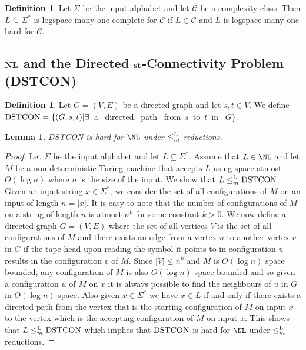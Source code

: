 \documentclass{amsbook}
\newtheorem{lemma}[theorem]{Lemma}
\theoremstyle{definition}
\newtheorem{definition}[theorem]{Definition}
\theoremstyle{remark}
\numberwithin{section}{chapter}
\numberwithin{equation}{chapter}
\newcommand{\Lredn}{\leq^{\small{\rm L}}_m}
\newcommand{\boldNL}{\mbox{\rm \bf NL}}
\begin{document}
\begin{definition}
Let $\Sigma$ be the input alphabet and let $\mathcal{C}$ be a complexity class. Then $L\subseteq \Sigma^*$ is logspace many-one complete for $\mathcal{C}$ if $L\in\mathcal{C}$ and $L$ is logspace many-one hard for $\mathcal{C}$.
\end{definition}

\subsection{$\boldNL$ and the Directed $\bf{st}$-Connectivity Problem (DSTCON)}
\begin{definition}\label{dstcon-defn}
Let $G=(V,E)$ be a directed graph and let $s,t\in V$. We define ${\rm DSTCON}=\{(G,s,t)|\exists${\rm ~a~ directed~ path~ from~}$s${\rm ~to~}$t$~{\rm in~ }$G\}$.
\end{definition}
\begin{lemma}\label{DSTCONisNLhard}
{\rm DSTCON} is hard for $\NL$ under $\Lredn$ reductions.
\end{lemma}
\begin{proof}
Let $\Sigma$ be the input alphabet and let $L\subseteq \Sigma^*$. Assume that $L\in \NL$ and let $M$ be a non-deterministic Turing machine that accepts $L$ using space atmost $O(\log n)$ where $n$ is the size of the input. We show that $L\Lredn {\rm DSTCON}$. Given an input string $x\in \Sigma^*$, we consider the set of all configurations of $M$ on an input of length $n=|x|$. It is easy to note that the number of configurations of $M$ on a string of length $n$ is atmost $n^k$ for some constant $k>0$. We now define a directed graph $G=(V,E)$ where the set of all vertices $V$ is the set of all configurations of $M$ and there exists an edge from a vertex $u$ to another vertex $v$ in $G$ if the tape head upon reading the symbol it points to in configuration $u$ results in the configuration $v$ of $M$. Since $|V|\leq n^k$ and $M$ is $O(\log n)$ space bounded, any configuration of $M$ is also $O(\log n)$ space bounded and so given a configuration $u$ of $M$ on $x$ it is always possible to find the neighbours of $u$ in $G$ in $O(\log n)$ space. Also given $x\in \Sigma^*$ we have $x\in L$ if and only if there exists a directed path from the vertex that is the starting configuration of $M$ on input $x$ to the vertex which is the accepting configuration of $M$ on input $x$. This shows that $L\Lredn {\rm DSTCON}$ which implies that ${\rm DSTCON}$ is hard for $\NL$ under $\Lredn$ reductions.
\end{proof}
\end{document}
